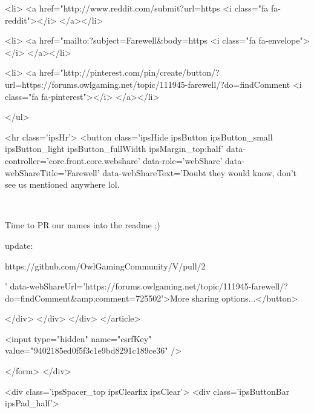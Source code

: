 			<li>
<a href="http://www.reddit.com/submit?url=https%
	<i class="fa fa-reddit"></i>
</a></li>
		
			<li>
<a href="mailto:?subject=Farewell&body=https%
	<i class="fa fa-envelope"></i>
</a></li>
		
			<li>
<a href="http://pinterest.com/pin/create/button/?url=https://forums.owlgaming.net/topic/111945-farewell/?do=findComment%
	<i class="fa fa-pinterest"></i>
</a></li>
		
	</ul>


	<hr class='ipsHr'>
	<button class='ipsHide ipsButton ipsButton_small ipsButton_light ipsButton_fullWidth ipsMargin_top:half' data-controller='core.front.core.webshare' data-role='webShare' data-webShareTitle='Farewell' data-webShareText='Doubt they would know, don’t see us mentioned anywhere lol.
 


	 
 


	Time to PR our names into the readme ;)
 


	update:
 


	https://github.com/OwlGamingCommunity/V/pull/2
 
' data-webShareUrl='https://forums.owlgaming.net/topic/111945-farewell/?do=findComment&amp;comment=725502'>More sharing options...</button>

	
</div>
</div>
	</div>
</article>
					
				
			
			
<input type="hidden" name="csrfKey" value="9402185ed0f5f3c1e9bd8291c189ce36" />


		</form>
	</div>

	
	
		<div class='ipsSpacer_top ipsClearfix ipsClear'>
			<div class='ipsButtonBar ipsPad_half'>


